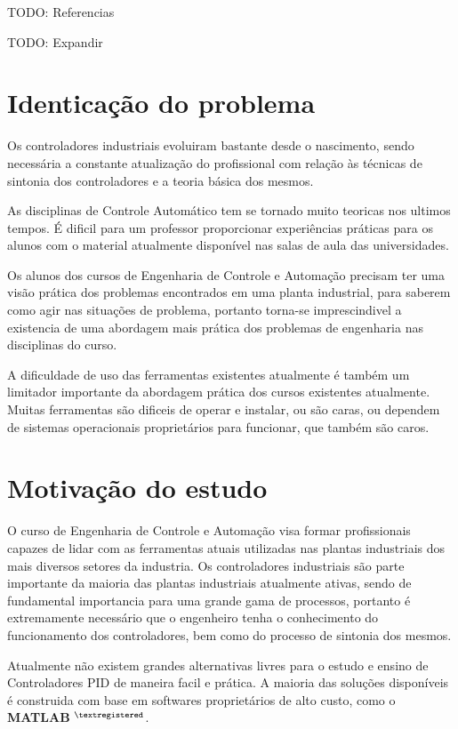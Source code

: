     TODO: Referencias

    TODO: Expandir


\section{Identicação do problema}
    
    Os controladores industriais evoluiram bastante desde o nascimento, sendo necessária
    a constante atualização do profissional com relação às técnicas de sintonia dos
    controladores e a teoria básica dos mesmos.

    As disciplinas de Controle Automático tem se tornado muito teoricas nos ultimos
    tempos. É dificil para um professor proporcionar experiências práticas para os
    alunos com o material atualmente disponível nas salas de aula das universidades.

    Os alunos dos cursos de Engenharia de Controle e Automação precisam ter uma
    visão prática dos problemas encontrados em uma planta industrial, para saberem
    como agir nas situações de problema, portanto torna-se imprescindivel a existencia
    de uma abordagem mais prática dos problemas de engenharia nas disciplinas do curso.

    A dificuldade de uso das ferramentas existentes atualmente é também um limitador
    importante da abordagem prática dos cursos existentes atualmente. Muitas ferramentas
    são dificeis de operar e instalar, ou são caras, ou dependem de sistemas operacionais
    proprietários para funcionar, que também são caros.

\section{Motivação do estudo}

    O curso de Engenharia de Controle e Automação visa formar profissionais
    capazes de lidar com as ferramentas atuais utilizadas nas plantas industriais
    dos mais diversos setores da industria. Os controladores industriais são
    parte importante da maioria das plantas industriais atualmente ativas,
    sendo de fundamental importancia para uma grande gama de processos, portanto
    é extremamente necessário que o engenheiro tenha o conhecimento do funcionamento
    dos controladores, bem como do processo de sintonia dos mesmos.
    
    Atualmente não existem grandes alternativas livres para o estudo e ensino
    de Controladores PID de maneira facil e prática. A maioria das soluções
    disponíveis é construida com base em softwares proprietários de alto custo,
    como o \textbf{MATLAB} $^{\textregistered}$.
    
